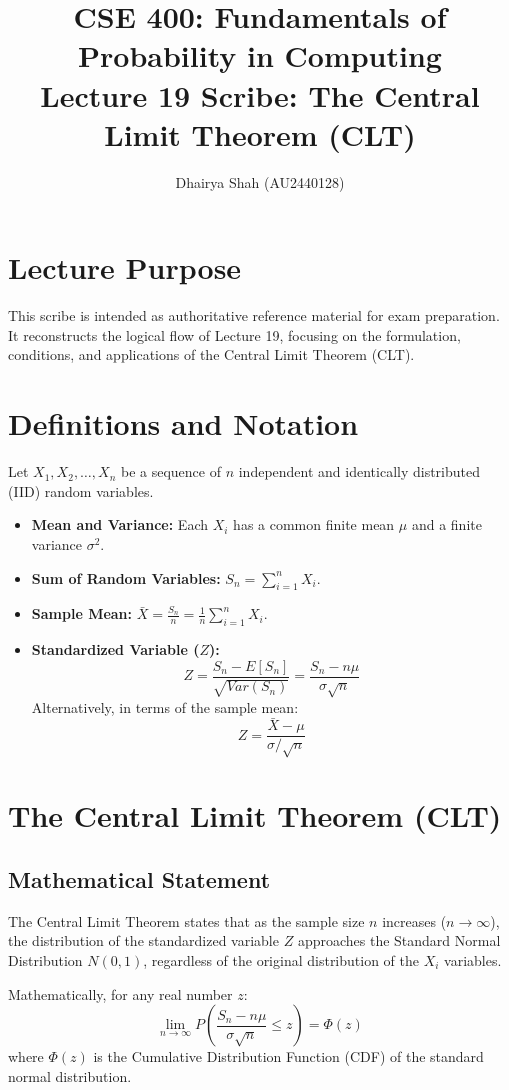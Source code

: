 \documentclass[11pt]{article}
\title{CSE 400: Fundamentals of Probability in Computing \\ \textbf{Lecture 19 Scribe: The Central Limit Theorem (CLT)}}
\author{Dhairya Shah (AU2440128)}
\date{}
\begin{document}
\maketitle

\section*{Lecture Purpose}
This scribe is intended as authoritative reference material for exam preparation. It reconstructs the logical flow of Lecture 19, focusing on the formulation, conditions, and applications of the Central Limit Theorem (CLT).

\section{Definitions and Notation}
Let $X_1, X_2, \dots, X_n$ be a sequence of $n$ independent and identically distributed (IID) random variables.

\begin{itemize}
    \item \textbf{Mean and Variance:} Each $X_i$ has a common finite mean $\mu$ and a finite variance $\sigma^2$.
    \item \textbf{Sum of Random Variables:} $S_n = \sum_{i=1}^n X_i$.
    \item \textbf{Sample Mean:} $\bar{X} = \frac{S_n}{n} = \frac{1}{n} \sum_{i=1}^n X_i$.
    \item \textbf{Standardized Variable ($Z$):} 
    \[ Z = \frac{S_n - E[S_n]}{\sqrt{Var(S_n)}} = \frac{S_n - n\mu}{\sigma\sqrt{n}} \]
    Alternatively, in terms of the sample mean:
    \[ Z = \frac{\bar{X} - \mu}{\sigma/\sqrt{n}} \]
\end{itemize}

\section{The Central Limit Theorem (CLT)}
\subsection{Mathematical Statement}
The Central Limit Theorem states that as the sample size $n$ increases ($n \to \infty$), the distribution of the standardized variable $Z$ approaches the Standard Normal Distribution $N(0, 1)$, regardless of the original distribution of the $X_i$ variables.

Mathematically, for any real number $z$:
\[ \lim_{n \to \infty} P\left( \frac{S_n - n\mu}{\sigma\sqrt{n}} \le z \right) = \Phi(z) \]
where $\Phi(z)$ is the Cumulative Distribution Function (CDF) of the standard normal distribution.
\end{document}
